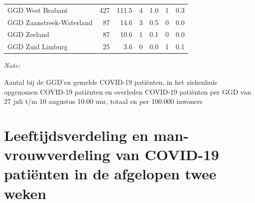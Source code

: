 \documentclass[
  english,
  man,floatsintext]{apa6}
\begin{document}
\begin{table}[H]
\begin{threeparttable}
\begin{tabular}{lrrrrrr}
GGD West Brabant & 427 & 111.5 & 4 & 1.0 & 1 & 0.3\\
GGD Zaanstreek-Waterland & 87 & 14.6 & 3 & 0.5 & 0 & 0.0\\
GGD Zeeland & 87 & 10.6 & 1 & 0.1 & 0 & 0.0\\
GGD Zuid Limburg & 25 & 3.6 & 0 & 0.0 & 1 & 0.1\\
\bottomrule
\end{tabular}
\begin{tablenotes}
\item \textit{Note: } 
\item Aantal bij de GGD’en gemelde COVID-19 patiënten, in het ziekenhuis opgenomen COVID-19 patiënten en overleden COVID-19 patiënten per GGD van 27 juli t/m 10 augustus 10:00 uur, totaal en per 100.000 inwoners
\end{tablenotes}
\end{threeparttable}
\endgroup{}
\end{table}

\newpage

\hypertarget{leeftijdsverdeling-en-man-vrouwverdeling-van-covid-19-patiuxebnten-in-de-afgelopen-twee-weken}{%
\section{Leeftijdsverdeling en man-vrouwverdeling van COVID-19 patiënten in de afgelopen twee weken}\label{leeftijdsverdeling-en-man-vrouwverdeling-van-covid-19-patiuxebnten-in-de-afgelopen-twee-weken}}
\end{document}
